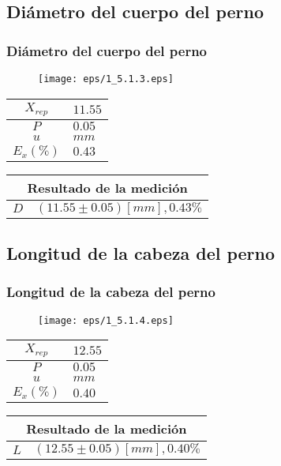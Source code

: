 \documentclass[letter,11pt]{beamer}
\begin{document}
\subsection{Diámetro del cuerpo del perno}
\begin{frame}
\frametitle{Diámetro del cuerpo del perno}
\vspace*{0.8cm}
\begin{figure}
\centering
\texttt{[image: eps/1\_5.1.3.eps]}
\end{figure}
\vspace*{0.4cm}
\scriptsize
\begin{tabular}{|c|>{\centering}m{1.8cm}<{\centering}|}
\hline
$X_{rep}$ &  $11.55$ \tabularnewline \hline
      $P$ &   $0.05$ \tabularnewline \hline
      $u$ &     $mm$ \tabularnewline \hline
$E_x(\%)$ &   $0.43$ \tabularnewline \hline
\end{tabular}
\quad
\begin{tabular}{|c|>{\centering}m{5.7cm}<{\centering}|}
\hline
\multicolumn{2}{|c|}{\textbf{Resultado de la medición}} \\ \hline
$D$ & $( 11.55\pm0.05)[mm], 0.43\%$ \tabularnewline \hline
\end{tabular}
\end{frame}

\subsection{Longitud de la cabeza del perno}
\begin{frame}
\frametitle{Longitud de la cabeza del perno}
\vspace*{0.8cm}
\begin{figure}
\centering
\texttt{[image: eps/1\_5.1.4.eps]}
\end{figure}
\vspace*{0.4cm}
\scriptsize
\begin{tabular}{|c|>{\centering}m{1.8cm}<{\centering}|}
\hline
$X_{rep}$ &  $12.55$ \tabularnewline \hline
      $P$ &   $0.05$ \tabularnewline \hline
      $u$ &     $mm$ \tabularnewline \hline
$E_x(\%)$ &   $0.40$ \tabularnewline \hline
\end{tabular}
\quad
\begin{tabular}{|c|>{\centering}m{5.7cm}<{\centering}|}
\hline
\multicolumn{2}{|c|}{\textbf{Resultado de la medición}} \\ \hline
$L$ & $( 12.55\pm0.05)[mm], 0.40\%$ \tabularnewline \hline
\end{tabular}
\end{frame}
\end{document}
